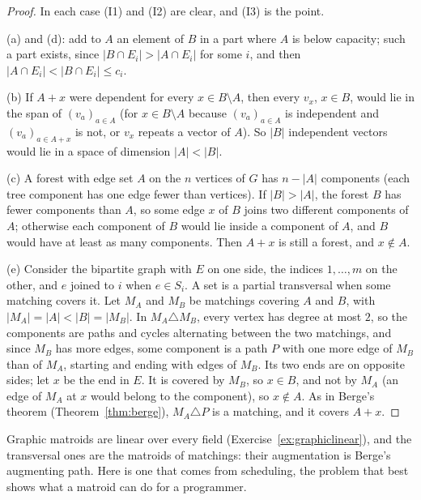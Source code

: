 \begin{proof}
In each case (I1) and (I2) are clear, and (I3) is the point.

(a) and (d): add to $A$ an element of $B$ in a part where $A$ is below capacity; such a part exists, since $|B\cap E_i|>|A\cap E_i|$ for some $i$, and then $|A\cap E_i|<|B\cap E_i|\le c_i$.

(b) If $A+x$ were dependent for every $x\in B\setminus A$, then every $v_x$, $x\in B$, would lie in the span of $(v_a)_{a\in A}$ (for $x\in B\setminus A$ because $(v_a)_{a\in A}$ is independent and
$(v_a)_{a\in A+x}$ is not, or $v_x$ repeats a vector of $A$). So $|B|$ independent vectors would lie in a space of dimension $|A|<|B|$.

(c) A forest with edge set $A$ on the $n$ vertices of $G$ has $n-|A|$ components (each tree component has one edge fewer than vertices). If $|B|>|A|$, the forest $B$ has fewer components than
$A$, so some edge $x$ of $B$ joins two different components of $A$; otherwise each component of $B$ would lie inside a component of $A$, and $B$ would have at least as many components. Then $A+x$ is
still a forest, and $x\notin A$.

(e) Consider the bipartite graph with $E$ on one side, the indices $1,\dots,m$ on the other, and $e$ joined to $i$ when $e\in S_i$. A set is a partial transversal when some matching covers it. Let
$M_A$ and $M_B$ be matchings covering $A$ and $B$, with $|M_A|=|A|<|B|=|M_B|$. In $M_A\triangle M_B$, every vertex has degree at most $2$, so the components are paths and cycles alternating between the two
matchings, and since $M_B$ has more edges, some component is a path $P$ with one more edge of $M_B$ than of $M_A$, starting and ending with edges of $M_B$. Its two ends are on opposite sides; let $x$ be
the end in $E$. It is covered by $M_B$, so $x\in B$, and not by $M_A$ (an edge of $M_A$ at $x$ would belong to the component), so $x\notin A$. As in Berge's theorem (Theorem~\ref{thm:berge}), $M_A\triangle P$
is a matching, and it covers $A+x$.
\end{proof}

Graphic matroids are linear over every field (Exercise~\ref{ex:graphiclinear}), and the transversal ones are the matroids of matchings: their augmentation is Berge's augmenting path. Here is one
that comes from scheduling, the problem that best shows what a matroid can do for a programmer.

